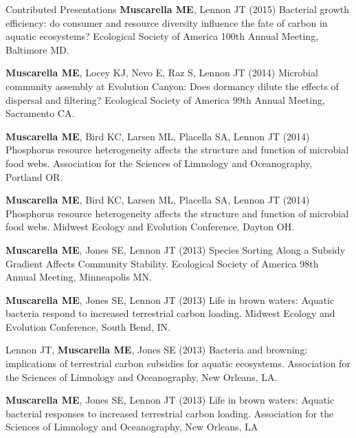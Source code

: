 \documentclass{resume} %
\begin{document}
\begin{rSection}{Contributed Presentations}
  {\bf Muscarella ME}, Lennon JT (2015) Bacterial growth efficiency: do
  consumer and resource diversity influence the fate of carbon in aquatic
  ecosystems? Ecological Society of America 100th Annual Meeting, Baltimore MD.

  {\bf Muscarella ME}, Locey KJ, Nevo E, Raz S, Lennon JT (2014) Microbial
  community assembly at Evolution Canyon: Does dormancy dilute the effects of
  dispersal and filtering? Ecological Society of America 99th Annual Meeting,
  Sacramento CA.

  {\bf Muscarella ME}, Bird KC, Larsen ML, Placella SA, Lennon JT (2014)
  Phosphorus resource heterogeneity affects the structure and function of
  microbial food webs. Association for the Sciences of Limnology and
  Oceanography, Portland OR.

  {\bf Muscarella ME}, Bird KC, Larsen ML, Placella SA, Lennon JT (2014)
  Phosphorus resource heterogeneity affects the structure and function of
  microbial food webs. Midwest Ecology and Evolution Conference, Dayton OH.

  {\bf Muscarella ME}, Jones SE, Lennon JT (2013) Species Sorting Along a
  Subsidy Gradient Affects Community Stability. Ecological Society of America
  98th Annual Meeting, Minneapolis MN.

  {\bf Muscarella ME}, Jones SE, Lennon JT (2013) Life in brown waters: Aquatic
  bacteria respond to increased terrestrial carbon loading. Midwest Ecology and
  Evolution Conference, South Bend, IN.

  Lennon JT, {\bf Muscarella ME}, Jones SE (2013) Bacteria and browning:
  implications of terrestrial carbon subsidies for aquatic ecosystems.
  Association for the Sciences of Limnology and Oceanography, New Orleans, LA.

  {\bf Muscarella ME}, Jones SE, Lennon JT (2013) Life in brown waters: Aquatic
  bacterial responses to increased terrestrial carbon loading. Association for
  the Sciences of Limnology and Oceanography, New Orleans, LA


\end{rSection}
\end{document}
